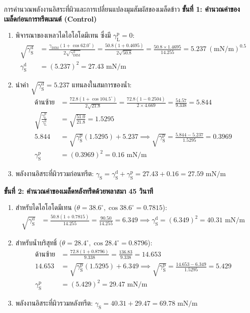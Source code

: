 \begin{examplebox}{การคำนวณพลังงานอิสระที่ผิวและการเปลี่ยนแปลงมุมสัมผัสของเมล็ดข้าว}
\textbf{ขั้นที่ 1: คำนวณค่าของเมล็ดก่อนการทรีตเมนต์ (Control)}
\begin{enumerate}
    \item พิจารณาของเหลวไดไอโอโดมีเทน ซึ่งมี $\gamma_{\text{L}}^{\text{p}} = 0$:
    \begin{align*}
        \sqrt{\gamma_{\text{S}}^{\text{d}}} &= \frac{\gamma_{\text{DIM}} (1 + \cos 62.0^\circ)}{2 \sqrt{\gamma_{\text{DIM}}^{\text{d}}}} = \frac{50.8 (1 + 0.4695)}{2 \sqrt{50.8}} = \frac{50.8 \times 1.4695}{14.255} = 5.237 \ (\text{mN/m})^{0.5} \\
        \gamma_{\text{S}}^{\text{d}} &= (5.237)^2 = 27.43 \text{ mN/m}
    \end{align*}
    \item นำค่า $\sqrt{\gamma_{\text{S}}^{\text{d}}} = 5.237$ แทนลงในสมการของน้ำ:
    \begin{align*}
        \text{ด้านซ้าย} &= \frac{72.8 (1 + \cos 104.5^\circ)}{2 \sqrt{21.8}} = \frac{72.8 (1 - 0.2504)}{2 \times 4.669} = \frac{54.57}{9.338} = 5.844 \\
        \sqrt{\frac{\gamma_{\text{L}}^{\text{p}}}{\gamma_{\text{L}}^{\text{d}}}} &= \sqrt{\frac{51.0}{21.8}} = 1.5295 \\
        5.844 &= \sqrt{\gamma_{\text{S}}^{\text{p}}} (1.5295) + 5.237 \implies \sqrt{\gamma_{\text{S}}^{\text{p}}} = \frac{5.844 - 5.237}{1.5295} = 0.3969 \\
        \gamma_{\text{S}}^{\text{p}} &= (0.3969)^2 = 0.16 \text{ mN/m}
    \end{align*}
    \item พลังงานอิสระที่ผิวรวมก่อนทรีต: $\gamma_{\text{S}} = \gamma_{\text{S}}^{\text{d}} + \gamma_{\text{S}}^{\text{p}} = 27.43 + 0.16 = 27.59 \text{ mN/m}$
\end{enumerate}

\textbf{ขั้นที่ 2: คำนวณค่าของเมล็ดหลังทรีตด้วยพลาสมา 45 วินาที}
\begin{enumerate}
    \item สำหรับไดไอโอโดมีเทน ($\theta = 38.6^\circ, \cos 38.6^\circ = 0.7815$):
    \begin{align*}
        \sqrt{\gamma_{\text{S}}^{\text{d}}} &= \frac{50.8 (1 + 0.7815)}{14.255} = \frac{90.50}{14.255} = 6.349 \implies \gamma_{\text{S}}^{\text{d}} = (6.349)^2 = 40.31 \text{ mN/m}
    \end{align*}
    \item สำหรับน้ำบริสุทธิ์ ($\theta = 28.4^\circ, \cos 28.4^\circ = 0.8796$):
    \begin{align*}
        \text{ด้านซ้าย} &= \frac{72.8 (1 + 0.8796)}{9.338} = \frac{136.83}{9.338} = 14.653 \\
        14.653 &= \sqrt{\gamma_{\text{S}}^{\text{p}}} (1.5295) + 6.349 \implies \sqrt{\gamma_{\text{S}}^{\text{p}}} = \frac{14.653 - 6.349}{1.5295} = 5.429 \\
        \gamma_{\text{S}}^{\text{p}} &= (5.429)^2 = 29.47 \text{ mN/m}
    \end{align*}
    \item พลังงานอิสระที่ผิวรวมหลังทรีต: $\gamma_{\text{S}} = 40.31 + 29.47 = 69.78 \text{ mN/m}$
\end{enumerate}


\end{examplebox}
